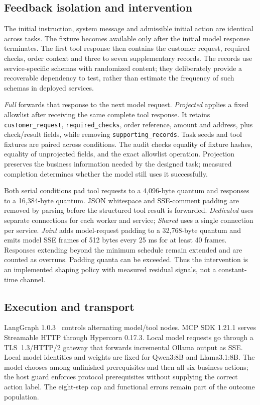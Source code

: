 \subsection{Feedback isolation and intervention}
The initial instruction, system message and admissible initial action are identical across tasks. The fixture becomes available only after the initial model response terminates. The first tool response then contains the customer request, required checks, order context and three to seven supplementary records. The records use service-specific schemas with randomized content; they deliberately provide a recoverable dependency to test, rather than estimate the frequency of such schemas in deployed services.

\emph{Full} forwards that response to the next model request. \emph{Projected} applies a fixed allowlist after receiving the same complete tool response. It retains \texttt{customer\_request}, \texttt{required\_checks}, order reference, amount and address, plus check/result fields, while removing \texttt{supporting\_records}. Task seeds and tool fixtures are paired across conditions. The audit checks equality of fixture hashes, equality of unprojected fields, and the exact allowlist operation. Projection preserves the business information needed by the designed task; measured completion determines whether the model still uses it successfully.

Both serial conditions pad tool requests to a 4,096-byte quantum and responses to a 16,384-byte quantum. JSON whitespace and SSE-comment padding are removed by parsing before the structured tool result is forwarded. \emph{Dedicated} uses separate connections for each worker and service; \emph{Shared} uses a single connection per service. \emph{Joint} adds model-request padding to a 32,768-byte quantum and emits model SSE frames of 512 bytes every 25 ms for at least 40 frames. Responses extending beyond the minimum schedule remain extended and are counted as overruns. Padding quanta can be exceeded. Thus the intervention is an implemented shaping policy with measured residual signals, not a constant-time channel.

\subsection{Execution and transport}
LangGraph 1.0.3~\cite{langchain2025langgraph} controls alternating model/tool nodes. MCP SDK 1.21.1 serves Streamable HTTP through Hypercorn 0.17.3. Local model requests go through a TLS~1.3/HTTP/2 gateway that forwards incremental Ollama output as SSE. Local model identities and weights are fixed for Qwen3:8B and Llama3.1:8B. The model chooses among unfinished prerequisites and then all six business actions; the host guard enforces protocol prerequisites without supplying the correct action label. The eight-step cap and functional errors remain part of the outcome population.

